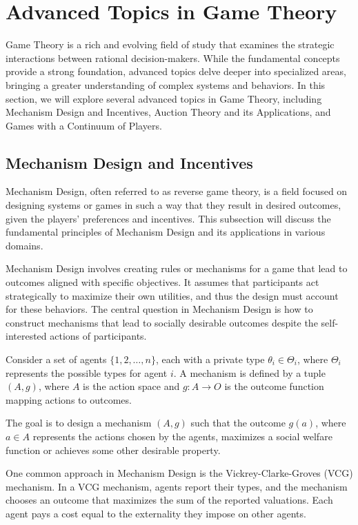 \documentclass[12pt]{book} %
\begin{document}
\section{Advanced Topics in Game Theory}
Game Theory is a rich and evolving field of study that examines the strategic interactions between rational decision-makers. While the fundamental concepts provide a strong foundation, advanced topics delve deeper into specialized areas, bringing a greater understanding of complex systems and behaviors. In this section, we will explore several advanced topics in Game Theory, including Mechanism Design and Incentives, Auction Theory and its Applications, and Games with a Continuum of Players.

\subsection{Mechanism Design and Incentives}
Mechanism Design, often referred to as reverse game theory, is a field focused on designing systems or games in such a way that they result in desired outcomes, given the players' preferences and incentives. This subsection will discuss the fundamental principles of Mechanism Design and its applications in various domains.

Mechanism Design involves creating rules or mechanisms for a game that lead to outcomes aligned with specific objectives. It assumes that participants act strategically to maximize their own utilities, and thus the design must account for these behaviors. The central question in Mechanism Design is how to construct mechanisms that lead to socially desirable outcomes despite the self-interested actions of participants.

Consider a set of agents $\{1, 2, \ldots, n\}$, each with a private type $\theta_i \in \Theta_i$, where $\Theta_i$ represents the possible types for agent $i$. A mechanism is defined by a tuple $(A, g)$, where $A$ is the action space and $g: A \to O$ is the outcome function mapping actions to outcomes.

The goal is to design a mechanism $(A, g)$ such that the outcome $g(a)$, where $a \in A$ represents the actions chosen by the agents, maximizes a social welfare function or achieves some other desirable property.

One common approach in Mechanism Design is the Vickrey-Clarke-Groves (VCG) mechanism. In a VCG mechanism, agents report their types, and the mechanism chooses an outcome that maximizes the sum of the reported valuations. Each agent pays a cost equal to the externality they impose on other agents.
\end{document}
